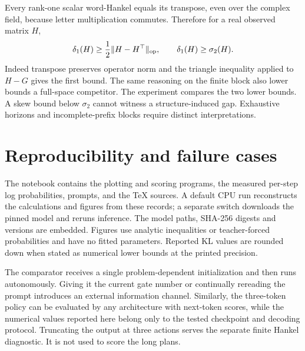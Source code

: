Every rank-one scalar word-Hankel equals its transpose, even over the complex field, because letter multiplication commutes. Therefore for a real observed matrix \(H\),
\[
 \delta_1(H)\ge \frac12\|H-H^\top\|_{\mathrm{op}},
 \qquad \delta_1(H)\ge\sigma_2(H).
\]
Indeed transpose preserves operator norm and the triangle inequality applied to \(H-G\) gives the first bound. The same reasoning on the finite block also lower bounds a full-space competitor. The experiment compares the two lower bounds. A skew bound below \(\sigma_2\) cannot witness a structure-induced gap. Exhaustive horizons and incomplete-prefix blocks require distinct interpretations.

\section{Reproducibility and failure cases}\label{app:repro}
The notebook contains the plotting and scoring programs, the measured per-step log probabilities, prompts, and the TeX sources. A default CPU run reconstructs the calculations and figures from these records; a separate switch downloads the pinned model and reruns inference. The model paths, SHA-256 digests and versions are embedded. Figures use analytic inequalities or teacher-forced probabilities and have no fitted parameters. Reported KL values are rounded down when stated as numerical lower bounds at the printed precision.


The comparator receives a single problem-dependent initialization and then runs autonomously. Giving it the current gate number or continually rereading the prompt introduces an external information channel. Similarly, the three-token policy can be evaluated by any architecture with next-token scores, while the numerical values reported here belong only to the tested checkpoint and decoding protocol. Truncating the output at three actions serves the separate finite Hankel diagnostic. It is not used to score the long plans.
